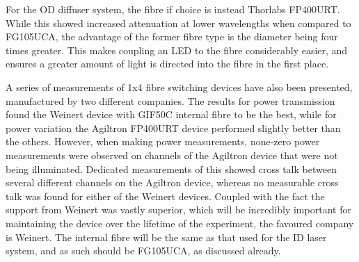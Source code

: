 \documentclass[a4paper,11pt]{article}
\begin{document}
For the OD diffuser system, the fibre if choice is instead Thorlabs FP400URT. While this showed increased attenuation at lower wavelengths when compared to FG105UCA, the advantage of the former fibre type is the diameter being four times greater. This makes coupling an LED to the fibre considerably easier, and ensures a greater amount of light is directed into the fibre in the first place.

A series of measurements of 1x4 fibre switching devices have also been presented, manufactured by two different companies. The results for power transmission found the Weinert device with GIF50C internal fibre to be the best, while for power variation the Agiltron FP400URT device performed slightly better than the others. However, when making power measurements, none-zero power measurements were observed on channels of the Agiltron device that were not being illuminated. Dedicated measurements of this showed cross talk between several different channels on the Agiltron device, whereas no measurable cross talk was found for either of the Weinert devices. Coupled with the fact the support from Weinert was vastly superior, which will be incredibly important for maintaining the device over the lifetime of the experiment, the favoured company is Weinert. The internal fibre will be the same as that used for the ID laser system, and as such should be FG105UCA, as discussed already.
\end{document}
